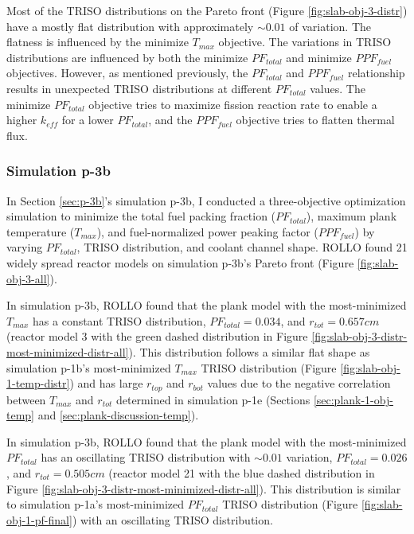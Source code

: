 Most of the \gls{TRISO} distributions on the Pareto front (Figure 
\ref{fig:slab-obj-3-distr}) have a mostly flat distribution with approximately 
$\sim0.01$ of variation. 
The flatness is influenced by the minimize $T_{max}$ objective. 
The variations in \gls{TRISO} distributions are influenced by both the minimize 
$PF_{total}$ and minimize $PPF_{fuel}$ objectives. 
However, as mentioned previously, the $PF_{total}$ and $PPF_{fuel}$ relationship
results in unexpected TRISO distributions at different $PF_{total}$ values. 
The minimize $PF_{total}$ objective tries to maximize fission reaction rate
to enable a higher $k_{eff}$ for a lower $PF_{total}$, and 
the $PPF_{fuel}$ objective tries to flatten thermal flux. 

\subsubsection{Simulation p-3b}
In Section \ref{sec:p-3b}'s simulation p-3b, I conducted a three-objective 
optimization simulation to minimize the total fuel packing fraction ($PF_{total}$), 
maximum plank temperature ($T_{max}$), and fuel-normalized power peaking factor 
($PPF_{fuel}$) by varying $PF_{total}$, TRISO distribution, and coolant channel shape.
\gls{ROLLO} found 21 widely spread reactor models on simulation p-3b's Pareto 
front (Figure \ref{fig:slab-obj-3-all}). 

In simulation p-3b, \gls{ROLLO} found that the plank model with the most-minimized 
$T_{max}$ has a constant TRISO distribution, $PF_{total} = 0.034$, and $r_{tot}=0.657cm$ 
(reactor model 3 with the green dashed distribution in Figure 
\ref{fig:slab-obj-3-distr-most-minimized-distr-all}).
This distribution follows a similar flat shape as simulation p-1b's most-minimized 
$T_{max}$ TRISO distribution (Figure \ref{fig:slab-obj-1-temp-distr}) and has large 
$r_{top}$ and $r_{bot}$ values due to the negative correlation between $T_{max}$ 
and $r_{tot}$ determined in simulation p-1e (Sections \ref{sec:plank-1-obj-temp} and 
\ref{sec:plank-discussion-temp}). 

In simulation p-3b, \gls{ROLLO} found that the plank model with the most-minimized 
$PF_{total}$ has an oscillating TRISO distribution with $\sim0.01$ variation,
$PF_{total} = 0.026$, and $r_{tot}=0.505cm$
(reactor model 21 with the blue dashed distribution in Figure \ref{fig:slab-obj-3-distr-most-minimized-distr-all}).
This distribution is similar to simulation p-1a's most-minimized $PF_{total}$ TRISO 
distribution (Figure \ref{fig:slab-obj-1-pf-final}) with an oscillating TRISO 
distribution.

